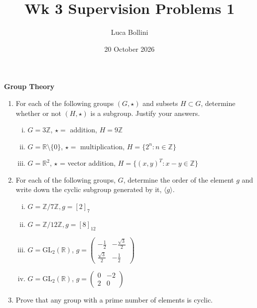 \documentclass{article}
\title{Wk 3 Supervision Problems 1}
\author{Luca Bollini}
\date{20 October 2026}
\newcommand{\Z}{\mathbb{Z}}
\newcommand{\R}{\mathbb{R}}
\begin{document}
\maketitle

\begin{center}
\huge{\textbf{Group Theory}}
\end{center}

\begin{enumerate}
    \item For each of the following groups $(G, \star)$ and subsets $H\subset G$, determine whether or not $(H,\star)$ is a   subgroup. Justify your answers.
    \begin{enumerate}[(i)]
    \item $G= 3\Z$, $\star=$ addition, $H= 9\Z$
    \item $G = \R\setminus\{0\}$, $\star=$ multiplication, $H = \{2^n:n\in\Z\}$
    \item $G = \R^2$, $\star$ = vector addition, $H = \{(x,y)^T : x-y\in\Z\}$
    \end{enumerate}
        
    \item For each of the following groups, $G$, determine the order of the element $g$ and write down the cyclic subgroup generated by it, $\langle g\rangle$.
    \begin{enumerate}[(i)]
        \item $G=\Z/7\Z, g=[2]_7$
        \item $G=\Z/12\Z, g=[8]_{12}$
        \item $G= \text{GL}_2(\R)$, $g = \begin{pmatrix}-\frac{1}{2} &-\frac{\sqrt3}{2}\\ \frac{\sqrt3}{2} &-\frac{1}{2}\end{pmatrix}$
        \item $G= \text{GL}_2(\R)$, $g = \begin{pmatrix}0 &-2\\ 2 & 0\end{pmatrix}$
    \end{enumerate}
    
    \item Prove that any group with a prime number of elements is cyclic.
    
\end{enumerate}
\end{document}
